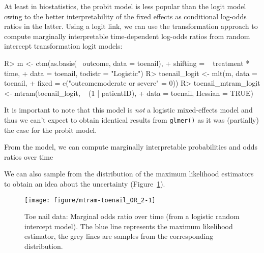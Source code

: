 \documentclass[article,nojss,shortnames]{jss}\usepackage[]{graphicx}\usepackage[]{xcolor}
\newcommand{\cmd}[1]{\texttt{#1()}}
\begin{document}
At least in biostatistics, the probit model is less popular than the logit
model owing to the better interpretability of the fixed effects as
conditional log-odds ratios in the latter. Using a logit link, we can use
the transformation approach to compute marginally interpretable
time-dependent log-odds ratios from random intercept transformation logit
models:%
\begin{Schunk}
\begin{Sinput}
R> m <- ctm(as.basis(~ outcome, data = toenail), 
+           shifting = ~ treatment * time, 
+           data = toenail, todistr = "Logistic")
R> toenail_logit <- mlt(m, data = toenail, 
+                       fixed = c("outcomemoderate or severe" = 0))
R> toenail_mtram_logit <- mtram(toenail_logit, ~ (1 | patientID), 
+                               data = toenail, Hessian = TRUE)
\end{Sinput}
\end{Schunk}
It is important to note that this model is \emph{not} a logistic 
mixed-effects model and thus we can't expect to obtain identical 
results from \cmd{glmer} as it was (partially) the case for the probit
model.

From the model, we can compute marginally interpretable 
probabilities and odds ratios over time
\begin{Schunk}
\end{Schunk}

We can also sample from the distribution of the maximum likelihood
estimators to obtain an idea about the uncertainty
(Figure~\ref{fig:toenailOR}).

\begin{figure}[t]
\begin{Schunk}


{\centering \texttt{[image: figure/mtram-toenail\_OR\_2-1]} 

}

\end{Schunk}
\caption{Toe nail data: Marginal odds ratio over time (from a logistic
  random intercept model). The blue line represents the maximum likelihood
  estimator, the grey lines are samples from the corresponding distribution.
  \label{fig:toenailOR}}
\end{figure}
\end{document}
